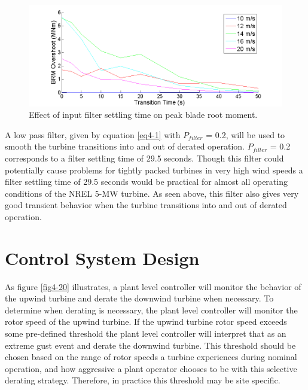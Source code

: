 \begin{figure}[htb]
	\centering
		\includegraphics[width = \linewidth]{Figures/ch4Figures/fig4-19.png}
		
	\caption{Effect of input filter settling time on peak blade root moment.}
	\label{fig4-19}
\end{figure}

A low pass filter, given by equation \ref{eq4-1} with $P_{filter}$ = 0.2, will be used to smooth the turbine transitions into and out of derated operation.  $P_{filter}$ = 0.2 corresponds to a filter settling time of 29.5 seconds. Though this filter could potentially cause problems for tightly packed turbines in very high wind speeds a filter settling time of 29.5 seconds would be practical for almost all operating conditions of the NREL 5-MW turbine. As seen above, this filter also gives very good transient behavior when the turbine transitions into and out of derated operation. 


\section{Control System Design} \label{section4-5}

As figure \ref{fig4-20} illustrates, a plant level controller will monitor the behavior of the upwind turbine and derate the downwind turbine when necessary. To determine when derating is necessary, the plant level controller will monitor the rotor speed of the upwind turbine. If the upwind turbine rotor speed exceeds some pre-defined threshold the plant level controller will interpret that as an extreme gust event and derate the downwind turbine. This threshold should be chosen based on the range of rotor speeds a turbine experiences during nominal operation, and how aggressive a plant operator chooses to be with this selective derating strategy. Therefore, in practice this threshold may be site specific. 

